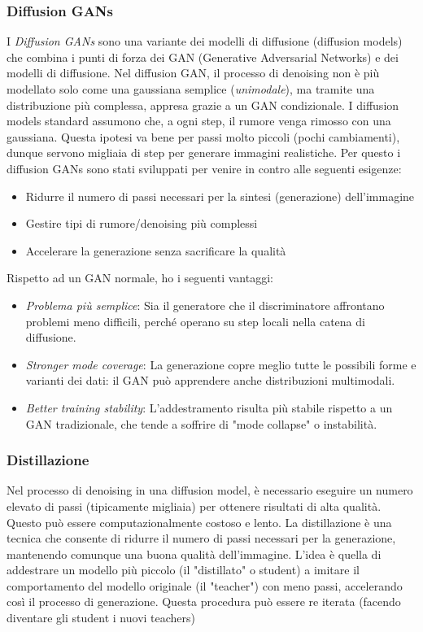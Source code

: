 \subsubsection{Diffusion GANs}
I \textit{Diffusion GANs} sono una variante dei modelli di diffusione (diffusion models) che combina i punti di forza dei GAN (Generative Adversarial Networks) e dei modelli di diffusione.
Nel diffusion GAN, il processo di denoising non è più modellato solo come una gaussiana semplice (\textit{unimodale}), ma tramite una distribuzione più complessa, appresa grazie a un GAN condizionale.
\vskip3mm
I diffusion models standard assumono che, a ogni step, il rumore venga rimosso con una gaussiana. Questa ipotesi va bene per passi molto piccoli (pochi cambiamenti), dunque servono migliaia di step per generare immagini realistiche. Per questo i diffusion GANs sono stati sviluppati per venire in contro alle seguenti esigenze:
\begin{itemize}
	\item Ridurre il numero di passi necessari per la sintesi (generazione) dell’immagine
	\item Gestire tipi di rumore/denoising più complessi
	\item Accelerare la generazione senza sacrificare la qualità
\end{itemize}

Rispetto ad un GAN normale, ho i seguenti vantaggi:
\begin{itemize}
	\item \textit{Problema più semplice}: Sia il generatore che il discriminatore affrontano problemi meno difficili, perché operano su step locali nella catena di diffusione.
	\item \textit{Stronger mode coverage}: La generazione copre meglio tutte le possibili forme e varianti dei dati: il GAN può apprendere anche distribuzioni multimodali.
	\item \textit{Better training stability}: L’addestramento risulta più stabile rispetto a un GAN tradizionale, che tende a soffrire di "mode collapse" o instabilità.
\end{itemize}

\subsubsection{Distillazione}
Nel processo di denoising in una diffusion model, è necessario eseguire un numero elevato di passi (tipicamente migliaia) per ottenere risultati di alta qualità. Questo può essere computazionalmente costoso e lento. La distillazione è una tecnica che consente di ridurre il numero di passi necessari per la generazione, mantenendo comunque una buona qualità dell'immagine. L'idea è quella di addestrare un modello più piccolo (il "distillato" o student) a imitare il comportamento del modello originale (il "teacher") con meno passi, accelerando così il processo di generazione. Questa procedura può essere re iterata (facendo diventare gli student i nuovi teachers)

